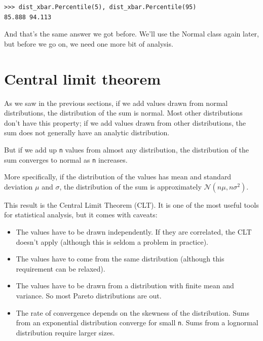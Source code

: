 \documentclass[12pt]{book}
\newcommand{\normal}{\mathcal{N}}
\theoremstyle{exercise}
\begin{document}
\begin{verbatim}
>>> dist_xbar.Percentile(5), dist_xbar.Percentile(95)
85.888 94.113
\end{verbatim}

And that's the same answer we got before.  We'll use the Normal
class again later, but before we go on, we need one more bit of
analysis.


\section{Central limit theorem}%
\label{CLT}

As we saw in the previous sections, if we add values drawn from normal
distributions, the distribution of the sum is normal.
Most other distributions don't have this property;
if we add values drawn from other distributions, the sum does not
generally have an analytic distribution.%
%
%
%
%

But if we add up {\tt n} values from
almost any distribution, the distribution of the sum converges to
normal as {\tt n} increases.

More specifically, if the distribution of the values has mean and
standard deviation $\mu$ and $\sigma$, the distribution of the sum is
approximately $\normal(n \mu, n \sigma^2)$.%

This result is the Central Limit Theorem (CLT).  It is one of the
most useful tools for statistical analysis, but it comes with
caveats:%
%

\begin{itemize}

\item The values have to be drawn independently.  If they are
correlated, the CLT doesn't apply (although this is seldom a problem
in practice).%

\item The values have to come from the same distribution (although
  this requirement can be relaxed).%

\item The values have to be drawn
  from a distribution with finite mean and variance.  So most Pareto
  distributions are out.%
%
%
%
%
%

\item The rate of convergence depends
  on the skewness of the distribution.  Sums from an exponential
  distribution converge for small {\tt n}.  Sums from a
  lognormal distribution require larger sizes.%
%
%

\end{itemize}
\end{document}
